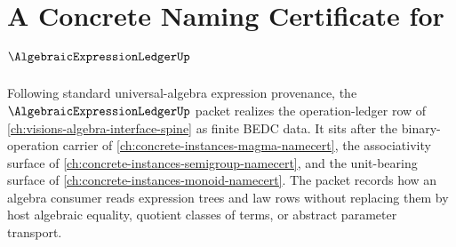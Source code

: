 \chapter{A Concrete Naming Certificate for $\AlgebraicExpressionLedgerUp$}
\label{ch:concrete-instances-algebraic-expression-ledger-namecert}

Following standard universal-algebra expression provenance, the $\AlgebraicExpressionLedgerUp$ packet realizes the operation-ledger row of \autoref{ch:visions-algebra-interface-spine} as finite BEDC data. It sits after the binary-operation carrier of \autoref{ch:concrete-instances-magma-namecert}, the associativity surface of \autoref{ch:concrete-instances-semigroup-namecert}, and the unit-bearing surface of \autoref{ch:concrete-instances-monoid-namecert}. The packet records how an algebra consumer reads expression trees and law rows without replacing them by host algebraic equality, quotient classes of terms, or abstract parameter transport.

